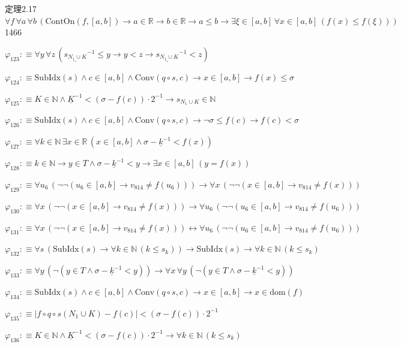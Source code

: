 \begin{fullproof}{定理2.17}{$\forall f\,\forall a\,\forall b\,(\mathrm{ContOn}(f,[a,b]) \to a \in \mathbb{R} \to b \in \mathbb{R} \to a \leq b \to \exists \xi \in [a,b]\,\forall x \in [a,b]\,(f(x) \leq f(\xi)))$}{1466}
\begin{abbrevlist}
\item $\varphi_{123} :\equiv \forall y\,\forall z\,(\underline{s_{N_{1} \cup K}}^{-1} \leq y \to y < z \to \underline{s_{N_{1} \cup K}}^{-1} < z)$
\item $\varphi_{124} :\equiv \mathrm{SubIdx}(s) \land c \in [a,b] \land \mathrm{Conv}(q \circ s,c) \to x \in [a,b] \to f(x) \leq \sigma$
\item $\varphi_{125} :\equiv K \in \mathbb{N} \land \underline{K}^{-1} < (\sigma - f(c)) \cdot 2^{-1} \to s_{N_{1} \cup K} \in \mathbb{N}$
\item $\varphi_{126} :\equiv \mathrm{SubIdx}(s) \land c \in [a,b] \land \mathrm{Conv}(q \circ s,c) \to \neg \sigma \leq f(c) \to f(c) < \sigma$
\item $\varphi_{127} :\equiv \forall k \in \mathbb{N}\,\exists x \in \mathbb{R}\,(x \in [a,b] \land \sigma - \underline{k}^{-1} < f(x))$
\item $\varphi_{128} :\equiv k \in \mathbb{N} \to y \in T \land \sigma - \underline{k}^{-1} < y \to \exists x \in [a,b]\,(y = f(x))$
\item $\varphi_{129} :\equiv \forall u_{6}\,(\neg \neg (u_{6} \in [a,b] \to v_{814} \neq f(u_{6}))) \to \forall x\,(\neg \neg (x \in [a,b] \to v_{814} \neq f(x)))$
\item $\varphi_{130} :\equiv \forall x\,(\neg \neg (x \in [a,b] \to v_{814} \neq f(x))) \to \forall u_{6}\,(\neg \neg (u_{6} \in [a,b] \to v_{814} \neq f(u_{6})))$
\item $\varphi_{131} :\equiv \forall x\,(\neg \neg (x \in [a,b] \to v_{814} \neq f(x))) \leftrightarrow \forall u_{6}\,(\neg \neg (u_{6} \in [a,b] \to v_{814} \neq f(u_{6})))$
\item $\varphi_{132} :\equiv \forall s\,(\mathrm{SubIdx}(s) \to \forall k \in \mathbb{N}\,(k \leq s_{k})) \to \mathrm{SubIdx}(s) \to \forall k \in \mathbb{N}\,(k \leq s_{k})$
\item $\varphi_{133} :\equiv \forall y\,(\neg (y \in T \land \sigma - \underline{k}^{-1} < y)) \to \forall x\,\forall y\,(\neg (y \in T \land \sigma - \underline{k}^{-1} < y))$
\item $\varphi_{134} :\equiv \mathrm{SubIdx}(s) \land c \in [a,b] \land \mathrm{Conv}(q \circ s,c) \to x \in [a,b] \to x \in \mathrm{dom}(f)$
\item $\varphi_{135} :\equiv \lvert f \circ q \circ s(N_{1} \cup K) - f(c) \rvert < (\sigma - f(c)) \cdot 2^{-1}$
\item $\varphi_{136} :\equiv K \in \mathbb{N} \land \underline{K}^{-1} < (\sigma - f(c)) \cdot 2^{-1} \to \forall k \in \mathbb{N}\,(k \leq s_{k})$

\end{abbrevlist}
\end{fullproof}
